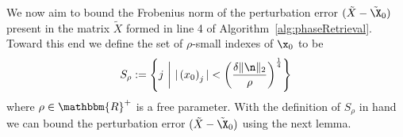 We now aim to bound the Frobenius norm of the perturbation error $(\tilde{X} - \tilde{\X}_0)$ present in the matrix $\tilde{X}$ formed in line 4 of Algorithm~\ref{alg:phaseRetrieval}.
Toward this end we define the set of $\rho$-small indexes of $\x_0$ to be 
\begin{equation}
S_\rho := \left\{ j~\bigg|~ | \left( x_0 \right)_j | < \left(\frac{\delta \| \n \|_2}{\rho} \right)^{\frac{1}{4}} \right\}
\label{equ:SrhoDef}
\end{equation}
where $\rho \in \mathbbm{R}^+$ is a free parameter.  
%
%
With the definition of $S_\rho$ in hand we can bound the perturbation error $(\tilde{X} - \tilde{\X}_0)$ using the next lemma.

